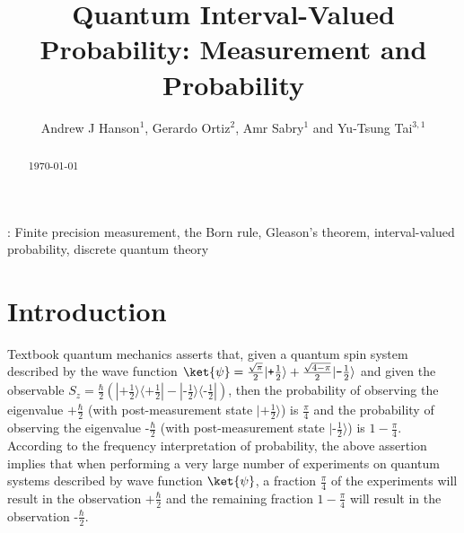 \documentclass[12pt]{iopart}
\theoremstyle{plain}
\theoremstyle{definition}
\theoremstyle{remark}
\newcommand{\fket}[1]{{|#1\rangle}}
\newcommand{\fproj}[1]{|#1\rangle\langle #1|}
\newcommand{\ps}{\texttt{+}}
\newcommand{\minus}{\texttt{-}}
\begin{document}
\title{Quantum Interval-Valued Probability: Measurement and Probability}

\author{Andrew J Hanson$^{1}$, Gerardo Ortiz$^{2}$,
Amr Sabry$^{1}$ and Yu-Tsung Tai$^{3,1}$}
\address{$^{1}$ School of Informatics and Computing, Indiana
University, Bloomington, IN 47405, USA}
\address{$^{2}$ Department of Physics, Indiana University, Bloomington, IN
47405, USA}
\address{$^{3}$ Department of Mathematics, Indiana University, Bloomington,
IN 47405, USA}
\begin{abstract}
\today
\end{abstract}
: {Finite precision measurement, the Born rule, Gleason's theorem, interval-valued
probability, discrete quantum theory}

\submitto{\jpa}

\section{Introduction}

Textbook quantum mechanics asserts that, given a quantum spin system
described by the wave function
$\ket{\psi}=\frac{\sqrt{\pi}}{2}\fket{\ps\frac{1}{2}}+\frac{\sqrt{4-\pi}}{2}\fket{\minus\frac{1}{2}}$
and given the observable
$S_z =
\frac{\hbar}{2}(\fproj{\ps\frac{1}{2}}-\fproj{\minus\frac{1}{2}})$,
then the probability of observing the eigenvalue $\ps\frac{\hbar}{2}$
(with post-measurement state $\fket{\ps\frac{1}{2}}$) is
$\frac{\pi}{4}$ and the probability of observing the eigenvalue
$\minus\frac{\hbar}{2}$ (with post-measurement state
$\fket{\minus\frac{1}{2}}$) is $1-\frac{\pi}{4}$. According to the
frequency interpretation of probability, the above assertion implies
that when performing a very large number of experiments on quantum
systems described by wave function $\ket{\psi}$, a fraction
$\frac{\pi}{4}$ of the experiments will result in the observation
$\ps\frac{\hbar}{2}$ and the remaining fraction $1-\frac{\pi}{4}$ will
result in the observation $\minus\frac{\hbar}{2}$.
\end{document}
